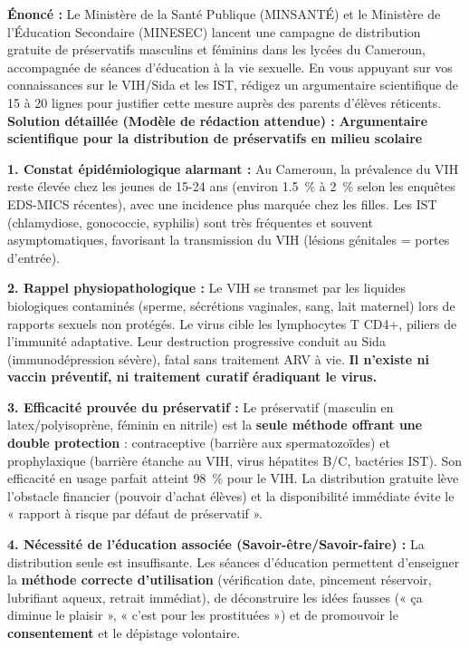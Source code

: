 \documentclass[11pt]{article}
\begin{document}
\begin{exoresolu}
    \textbf{Énoncé :} Le Ministère de la Santé Publique (MINSANTÉ) et le Ministère de l'Éducation Secondaire (MINESEC) lancent une campagne de distribution gratuite de préservatifs masculins et féminins dans les lycées du Cameroun, accompagnée de séances d'éducation à la vie sexuelle. En vous appuyant sur vos connaissances sur le VIH/Sida et les IST, rédigez un argumentaire scientifique de 15 à 20 lignes pour justifier cette mesure auprès des parents d'élèves réticents.
    \tcblower
    \textbf{Solution détaillée (Modèle de rédaction attendue) :}
    \textbf{Argumentaire scientifique pour la distribution de préservatifs en milieu scolaire}

    \textbf{1. Constat épidémiologique alarmant :} Au Cameroun, la prévalence du VIH reste élevée chez les jeunes de 15-24 ans (environ \SI{1,5}{\percent} à \SI{2}{\percent} selon les enquêtes EDS-MICS récentes), avec une incidence plus marquée chez les filles. Les IST (chlamydiose, gonococcie, syphilis) sont très fréquentes et souvent asymptomatiques, favorisant la transmission du VIH (lésions génitales = portes d'entrée).

    \textbf{2. Rappel physiopathologique :} Le VIH se transmet par les liquides biologiques contaminés (sperme, sécrétions vaginales, sang, lait maternel) lors de rapports sexuels non protégés. Le virus cible les lymphocytes T CD4+, piliers de l'immunité adaptative. Leur destruction progressive conduit au Sida (immunodépression sévère), fatal sans traitement ARV à vie. \textbf{Il n'existe ni vaccin préventif, ni traitement curatif éradiquant le virus.}

    \textbf{3. Efficacité prouvée du préservatif :} Le préservatif (masculin en latex/polyisoprène, féminin en nitrile) est la \textbf{seule méthode offrant une double protection} : contraceptive (barrière aux spermatozoïdes) et prophylaxique (barrière étanche au VIH, virus hépatites B/C, bactéries IST). Son efficacité en usage parfait atteint \SI{98}{\percent} pour le VIH. La distribution gratuite lève l'obstacle financier (pouvoir d'achat élèves) et la disponibilité immédiate évite le « rapport à risque par défaut de préservatif ».

    \textbf{4. Nécessité de l'éducation associée (Savoir-être/Savoir-faire) :} La distribution seule est insuffisante. Les séances d'éducation permettent d'enseigner la \textbf{méthode correcte d'utilisation} (vérification date, pincement réservoir, lubrifiant aqueux, retrait immédiat), de déconstruire les idées fausses (« ça diminue le plaisir », « c'est pour les prostituées ») et de promouvoir le \textbf{consentement} et le dépistage volontaire.


\end{exoresolu}
\end{document}
